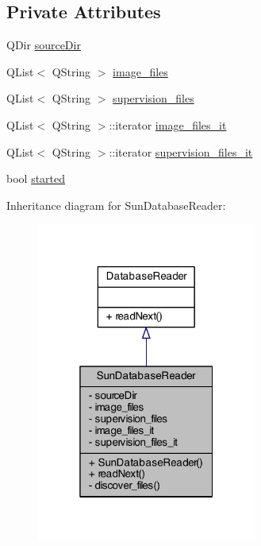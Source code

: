 \subsection*{Private Attributes}
\begin{DoxyCompactItemize}
\item 
Q\+Dir \hyperlink{class_sun_database_reader_a6bfc31b2ba24be2b3e18c32e0d343d70}{source\+Dir}
\item 
Q\+List$<$ Q\+String $>$ \hyperlink{class_sun_database_reader_a155716f43a3dc33e1a4d0a2a4a9f3ff1}{image\+\_\+files}
\item 
Q\+List$<$ Q\+String $>$ \hyperlink{class_sun_database_reader_ac5afd4950a668e5cff2bc5c6ea024b60}{supervision\+\_\+files}
\item 
Q\+List$<$ Q\+String $>$\+::iterator \hyperlink{class_sun_database_reader_a227d88c9c5c3d37b0f27123027c0b00e}{image\+\_\+files\+\_\+it}
\item 
Q\+List$<$ Q\+String $>$\+::iterator \hyperlink{class_sun_database_reader_a78e30a0ac9cfa46c23dbdf8d37226b51}{supervision\+\_\+files\+\_\+it}
\item 
bool \hyperlink{class_sun_database_reader_aa0b0c1f783f4382a9c8b10a1de1fec71}{started}
\end{DoxyCompactItemize}


Inheritance diagram for Sun\+Database\+Reader\+:\nopagebreak
\begin{figure}[H]
\begin{center}
\leavevmode
\includegraphics[width=205pt]{class_sun_database_reader__inherit__graph}
\end{center}
\end{figure}


